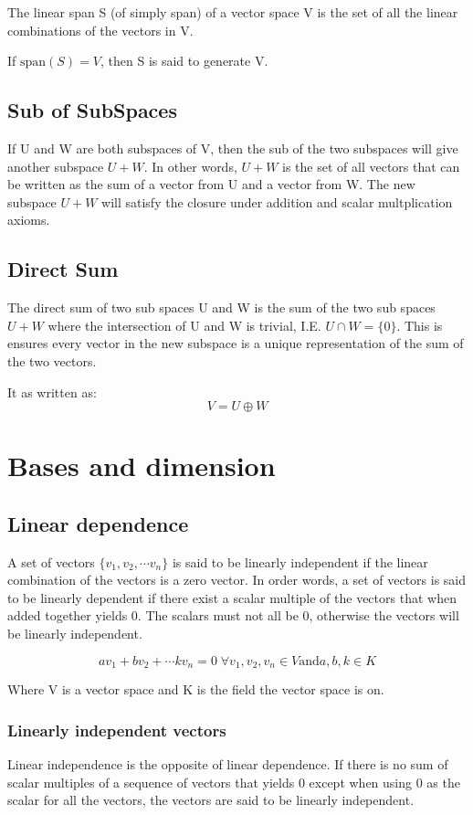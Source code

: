 \documentclass{book}
\begin{document}
The linear span S (of simply span) of a vector space V is the set of all the linear combinations of the vectors in V.

If \(\text{span}(S) = V\), then S is said to generate V.

\section{Sub of SubSpaces}
If U and W are both subspaces of V, then the sub of the two subspaces will give another subspace \(U + W\). In other words, \(U + W\) is the set of all vectors that can be written as the sum of a vector from U and a vector from W. The new subspace \(U + W\) will satisfy the closure under addition and scalar multplication axioms.

\section{Direct Sum}
The direct sum of two sub spaces U and W is the sum of the two sub spaces \(U + W\) where the intersection of U and W is trivial, I.E. \(U \cap W = \{0\}\). This is ensures every vector in the new subspace is a unique representation of the sum of the two vectors.

It as written as:
\[V = U \oplus W\]

\chapter{Bases and dimension}
\section{Linear dependence}
A set of vectors \(\{v_1, v_2, \cdots v_n\}\) is said to be linearly independent if the linear combination of the vectors is a zero vector. In order words, a set of vectors is said to be linearly dependent if there exist a scalar multiple of the vectors that when added together yields 0. The scalars must not all be 0, otherwise the vectors will be linearly independent.

\[a v_1 + b v_2 + \cdots k v_n = 0 \; \forall v_1, v_2, v_n \in V \text{and} a, b, k \in K\]

Where V is a vector space and K is the field the vector space is on.

\subsection{Linearly independent vectors}
Linear independence is the opposite of linear dependence. If there is no sum of scalar multiples of a sequence of vectors that yields 0 except when using 0 as the scalar for all the vectors, the vectors are said to be linearly independent.
\end{document}
